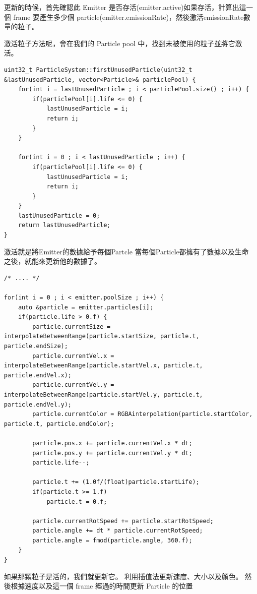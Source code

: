 更新的時候，首先確認此 Emitter 是否存活(emitter.active)如果存活，計算出這一個 frame 要產生多少個 particle(emitter.emissionRate)，然後激活emissionRate數量的粒子。

激活粒子方法呢，會在我們的 Particle pool 中，找到未被使用的粒子並將它激活。

\begin{lstlisting}
uint32_t ParticleSystem::firstUnusedParticle(uint32_t &lastUnusedParticle, vector<Particle>& particlePool) {
    for(int i = lastUnusedParticle ; i < particlePool.size() ; i++) {
        if(particlePool[i].life <= 0) {
            lastUnusedParticle = i;
            return i;
        }
    }

    for(int i = 0 ; i < lastUnusedParticle ; i++) {
        if(particlePool[i].life <= 0) {
            lastUnusedParticle = i;
            return i;
        }
    }
    lastUnusedParticle = 0;
    return lastUnusedParticle;
}
\end{lstlisting}

激活就是將Emitter的數據給予每個Partcle
當每個Particle都擁有了數據以及生命之後，就能來更新他的數據了。

\begin{lstlisting}
/* .... */

for(int i = 0 ; i < emitter.poolSize ; i++) {
    auto &particle = emitter.particles[i];
    if(particle.life > 0.f) {
        particle.currentSize = interpolateBetweenRange(particle.startSize, particle.t, particle.endSize);
        particle.currentVel.x = interpolateBetweenRange(particle.startVel.x, particle.t, particle.endVel.x);
        particle.currentVel.y = interpolateBetweenRange(particle.startVel.y, particle.t, particle.endVel.y);
        particle.currentColor = RGBAinterpolation(particle.startColor, particle.t, particle.endColor);

        particle.pos.x += particle.currentVel.x * dt;
        particle.pos.y += particle.currentVel.y * dt;
        particle.life--;

        particle.t += (1.0f/(float)particle.startLife);
        if(particle.t >= 1.f)
            particle.t = 0.f;

        particle.currentRotSpeed += particle.startRotSpeed;
        particle.angle += dt * particle.currentRotSpeed;
        particle.angle = fmod(particle.angle, 360.f);
    }
}
\end{lstlisting}

如果那顆粒子是活的，我們就更新它。 利用插值法更新速度、大小以及顏色。
然後根據速度以及這一個 frame 經過的時間更新 Particle 的位置

